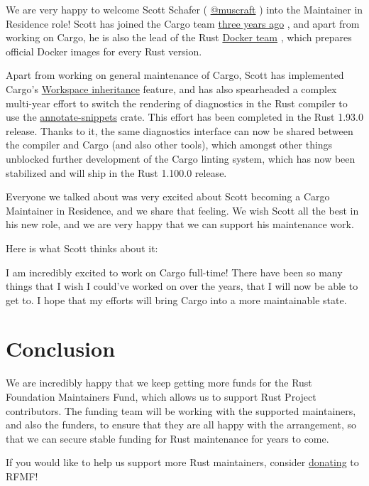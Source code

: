 \documentclass[11pt,a4paper]{article}
\begin{document}
We are very happy to welcome Scott Schafer ( \href{https://github.com/Muscraft}{@muscraft} ) into the Maintainer in Residence role! Scott has joined the Cargo team \href{https://blog.rust-lang.org/inside-rust/2023/04/06/cargo-new-members/}{three years ago} , and apart from working on Cargo, he is also the lead of the Rust \href{https://rust-lang.org/governance/teams/\#team-docker}{Docker team} , which prepares official Docker images for every Rust version.

Apart from working on general maintenance of Cargo, Scott has implemented Cargo's \href{https://doc.rust-lang.org/cargo/reference/workspaces.html\#the-package-table}{Workspace inheritance} feature, and has also spearheaded a complex multi-year effort to switch the rendering of diagnostics in the Rust compiler to use the \href{https://github.com/rust-lang/annotate-snippets-rs}{annotate-snippets} crate. This effort has been completed in the Rust 1.93.0 release. Thanks to it, the same diagnostics interface can now be shared between the compiler and Cargo (and also other tools), which amongst other things unblocked further development of the Cargo linting system, which has now been stabilized and will ship in the Rust 1.100.0 release.

Everyone we talked about was very excited about Scott becoming a Cargo Maintainer in Residence, and we share that feeling. We wish Scott all the best in his new role, and we are very happy that we can support his maintenance work.

Here is what Scott thinks about it:

I am incredibly excited to work on Cargo full-time! There have been so many things that I wish I could've worked on over the years, that I will now be able to get to. I hope that my efforts will bring Cargo into a more maintainable state.

\section{Conclusion}

We are incredibly happy that we keep getting more funds for the Rust Foundation Maintainers Fund, which allows us to support Rust Project contributors. The funding team will be working with the supported maintainers, and also the funders, to ensure that they are all happy with the arrangement, so that we can secure stable funding for Rust maintenance for years to come.

If you would like to help us support more Rust maintainers, consider \href{https://github.com/sponsors/rustfoundation}{donating} to RFMF!
\end{document}
